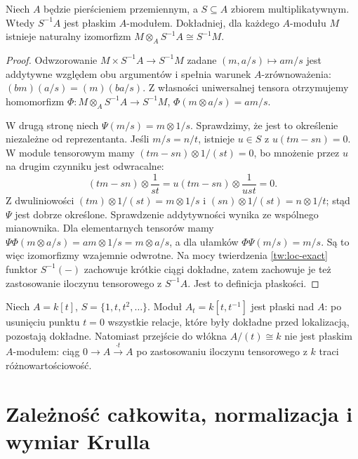 \begin{twierdzenie}
\label{tw:lokalizacja-plaska}
Niech $A$ będzie pierścieniem przemiennym, a $S\subseteq A$
zbiorem multiplikatywnym. Wtedy $S^{-1}A$ jest płaskim
$A$-modułem. Dokładniej, dla każdego $A$-modułu $M$
istnieje naturalny izomorfizm
$M\otimes_A S^{-1}A\cong S^{-1}M$.
\end{twierdzenie}
\begin{proof}
Odwzorowanie $M\times S^{-1}A\to S^{-1}M$ zadane
$(m,a/s)\mapsto am/s$ jest addytywne względem obu
argumentów i spełnia warunek $A$-zrównoważenia:
$(bm)(a/s)=(m)(ba/s)$. Z własności uniwersalnej
tensora otrzymujemy homomorfizm
$\Phi:M\otimes_A S^{-1}A\to S^{-1}M$,
$\Phi(m\otimes a/s)=am/s$.

W drugą stronę niech $\Psi(m/s)=m\otimes 1/s$.
Sprawdzimy, że jest to określenie niezależne od
reprezentanta. Jeśli $m/s=n/t$, istnieje $u\in S$
z $u(tm-sn)=0$. W module tensorowym mamy
$(tm-sn)\otimes 1/(st)=0$, bo mnożenie przez
$u$ na drugim czynniku jest odwracalne:
\[
 (tm-sn)\otimes\frac1{st}
 =u(tm-sn)\otimes\frac1{ust}=0.
\]
Z dwuliniowości
$(tm)\otimes 1/(st)=m\otimes 1/s$ i
$(sn)\otimes 1/(st)=n\otimes 1/t$;
stąd $\Psi$ jest dobrze określone. Sprawdzenie
addytywności wynika ze wspólnego mianownika.
Dla elementarnych tensorów mamy
$\Psi\Phi(m\otimes a/s)=am\otimes1/s
=m\otimes a/s$, a dla ułamków
$\Phi\Psi(m/s)=m/s$. Są to więc izomorfizmy
wzajemnie odwrotne. Na mocy twierdzenia
\ref{tw:loc-exact} funktor $S^{-1}(-)$ zachowuje
krótkie ciągi dokładne, zatem zachowuje je też
zastosowanie iloczynu tensorowego z $S^{-1}A$. Jest to definicja
płaskości.
\end{proof}

\begin{przyklad}
Niech $A=k[t]$, $S=\{1,t,t^2,\ldots\}$.
Moduł $A_t=k[t,t^{-1}]$ jest płaski nad $A$:
po usunięciu punktu $t=0$ wszystkie relacje,
które były dokładne przed lokalizacją, pozostają
dokładne. Natomiast przejście do włókna
$A/(t)\cong k$ nie jest płaskim $A$-modułem:
ciąg $0\to A\xrightarrow{\cdot t}A$ po
zastosowaniu iloczynu tensorowego z $k$ traci różnowartościowość.
\end{przyklad}

\section{Zależność całkowita, normalizacja i wymiar Krulla}
\label{sec:integral}

